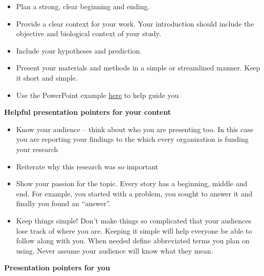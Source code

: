\documentclass[
]{book}
\providecommand{\tightlist}{%
  \setlength{\itemsep}{0pt}\setlength{\parskip}{0pt}}
\begin{document}
\begin{itemize}
\tightlist
\item
  Plan a strong, clear beginning and ending.
\item
  Provide a clear context for your work. Your introduction should include the objective and biological context of your study.
\item
  Include your hypotheses and prediction.
\item
  Present your materials and methods in a simple or streamlined manner. Keep it short and simple.
\item
  Use the PowerPoint example \href{https://osf.io/download/te4x7}{here} to help guide you
\end{itemize}

\textbf{Helpful presentation pointers for your content}

\begin{itemize}
\tightlist
\item
  Know your audience -- think about who you are presenting too. In this case you are reporting your findings to the which every organization is funding your research
\item
  Reiterate why this research was so important
\item
  Show your passion for the topic. Every story has a beginning, middle and end. For example, you started with a problem, you sought to answer it and finally you found an ``answer''.
\item
  Keep things simple! Don't make things so complicated that your audiences lose track of where you are. Keeping it simple will help everyone be able to follow along with you. When needed define abbreviated terms you plan on using. Never assume your audience will know what they mean.
\end{itemize}

\textbf{Presentation pointers for you}
\end{document}
